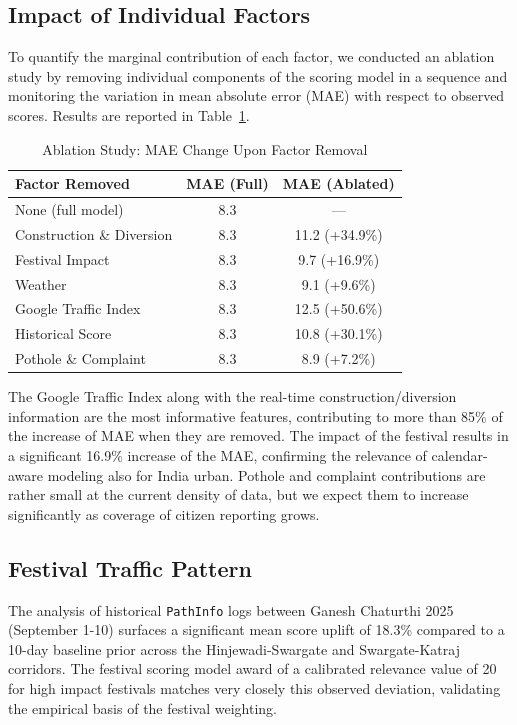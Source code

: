 \documentclass[conference]{IEEEtran}
\begin{document}
\subsection{Impact of Individual Factors}

To quantify the marginal contribution of each factor, we conducted an ablation study by removing individual components of the scoring model in a sequence and monitoring the variation in mean absolute error (MAE) with respect to observed scores. Results are reported in Table~\ref{tab:ablation}. 

\begin{table}[htbp]
\caption{Ablation Study: MAE Change Upon Factor Removal}
\begin{center}
\begin{tabular}{lcc}
\toprule
\textbf{Factor Removed} & \textbf{MAE (Full)} & \textbf{MAE (Ablated)} \\
\midrule
None (full model) & 8.3 & — \\
Construction \& Diversion & 8.3 & 11.2 (+34.9\%) \\
Festival Impact & 8.3 & 9.7 (+16.9\%) \\
Weather & 8.3 & 9.1 (+9.6\%) \\
Google Traffic Index & 8.3 & 12.5 (+50.6\%) \\
Historical Score & 8.3 & 10.8 (+30.1\%) \\
Pothole \& Complaint & 8.3 & 8.9 (+7.2\%) \\
\bottomrule
\end{tabular}
\label{tab:ablation}
\end{center}
\end{table}

The Google Traffic Index along with the real-time construction/diversion information are the most informative features, contributing to more than 85\% of the increase of MAE when they are removed. The impact of the festival results in a significant 16.9\% increase of the MAE, confirming the relevance of calendar-aware modeling also for India urban. Pothole and complaint contributions are rather small at the current density of data, but we expect them to increase significantly as coverage of citizen reporting grows. 

\subsection{Festival Traffic Pattern}

The analysis of historical \texttt{PathInfo} logs between Ganesh Chaturthi 2025 (September 1-10) surfaces a significant mean score uplift of 18.3\% compared to a 10-day baseline prior across the Hinjewadi-Swargate and Swargate-Katraj corridors. The festival scoring model award of a calibrated relevance value of 20 for high impact festivals matches very closely this observed deviation, validating the empirical basis of the festival weighting.
\end{document}
